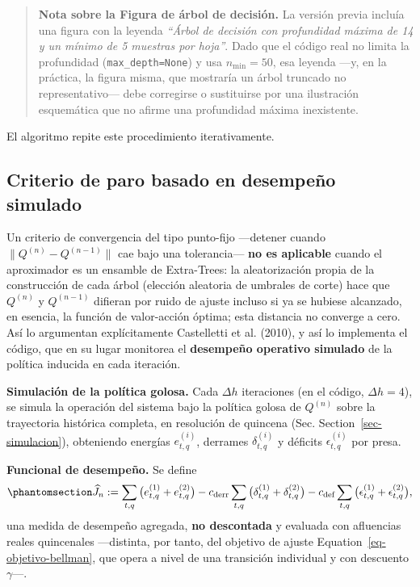 \documentclass[
  letterpaper,
  DIV=11,
  numbers=noendperiod]{scrreprt}
\theoremstyle{definition}
\theoremstyle{remark}
\begin{document}
\begin{quote}
\textbf{Nota sobre la Figura de árbol de decisión.} La versión previa
incluía una figura con la leyenda \emph{``Árbol de decisión con
profundidad máxima de 14 y un mínimo de 5 muestras por hoja''}. Dado que
el código real no limita la profundidad (\texttt{max\_depth=None}) y usa
\(n_{\min}=50\), esa leyenda ---y, en la práctica, la figura misma, que
mostraría un árbol truncado no representativo--- debe corregirse o
sustituirse por una ilustración esquemática que no afirme una
profundidad máxima inexistente.
\end{quote}

El algoritmo repite este procedimiento iterativamente.

\subsection{Criterio de paro basado en desempeño
simulado}\label{sec-criterio-paro}

Un criterio de convergencia del tipo punto-fijo ---detener cuando
\(\|Q^{(n)}-Q^{(n-1)}\|\) cae bajo una tolerancia--- \textbf{no es
aplicable} cuando el aproximador es un ensamble de Extra-Trees: la
aleatorización propia de la construcción de cada árbol (elección
aleatoria de umbrales de corte) hace que \(Q^{(n)}\) y \(Q^{(n-1)}\)
difieran por ruido de ajuste incluso si ya se hubiese alcanzado, en
esencia, la función de valor-acción óptima; esta distancia no converge a
cero. Así lo argumentan explícitamente Castelletti et al. (2010), y así
lo implementa el código, que en su lugar monitorea el \textbf{desempeño
operativo simulado} de la política inducida en cada iteración.

\textbf{Simulación de la política golosa.} Cada \(\Delta h\) iteraciones
(en el código, \(\Delta h=4\)), se simula la operación del sistema bajo
la política golosa de \(Q^{(n)}\) sobre la trayectoria histórica
completa, en resolución de quincena (Sec. Section~\ref{sec-simulacion}),
obteniendo energías \(e^{(i)}_{t,q}\), derrames \(\delta^{(i)}_{t,q}\) y
déficits \(\epsilon^{(i)}_{t,q}\) por presa.

\textbf{Funcional de desempeño.} Se define
\begin{equation}\protect\phantomsection\label{eq-desempeno-Jn}{
\widehat J_n := \sum_{t,q}\big(e^{(1)}_{t,q}+e^{(2)}_{t,q}\big) - c_{\text{derr}}\sum_{t,q}\big(\delta^{(1)}_{t,q}+\delta^{(2)}_{t,q}\big) - c_{\text{def}}\sum_{t,q}\big(\epsilon^{(1)}_{t,q}+\epsilon^{(2)}_{t,q}\big),
}\end{equation} una medida de desempeño agregada, \textbf{no descontada}
y evaluada con afluencias reales quincenales ---distinta, por tanto, del
objetivo de ajuste Equation~\ref{eq-objetivo-bellman}, que opera a nivel
de una transición individual y con descuento \(\gamma\)---.
\end{document}
